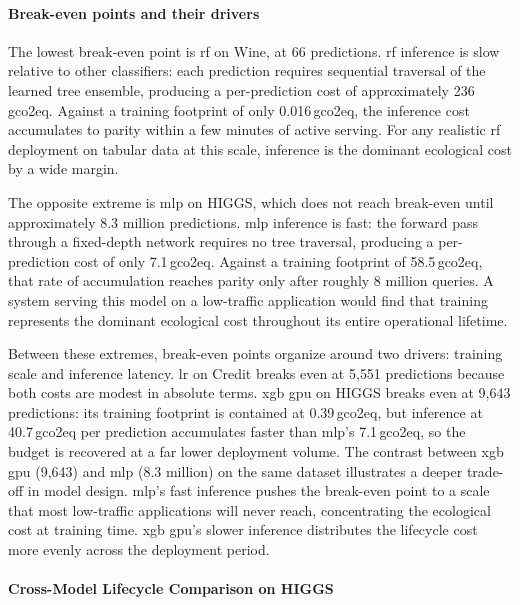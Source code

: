 \paragraph{Break-even points and their drivers}
The lowest break-even point is \gls{rf} on Wine, at 66 predictions. \gls{rf} inference is slow relative to other classifiers: each prediction requires sequential traversal of the learned tree ensemble, producing a per-prediction cost of approximately 236\,\textmu\gls{gco2eq}. Against a training footprint of only 0.016\,\gls{gco2eq}, the inference cost accumulates to parity within a few minutes of active serving. For any realistic \gls{rf} deployment on tabular data at this scale, inference is the dominant ecological cost by a wide margin.

The opposite extreme is \gls{mlp} on HIGGS, which does not reach break-even until approximately 8.3 million predictions. \gls{mlp} inference is fast: the forward pass through a fixed-depth network requires no tree traversal, producing a per-prediction cost of only 7.1\,\textmu\gls{gco2eq}. Against a training footprint of 58.5\,\gls{gco2eq}, that rate of accumulation reaches parity only after roughly 8 million queries. A system serving this model on a low-traffic application would find that training represents the dominant ecological cost throughout its entire operational lifetime.

Between these extremes, break-even points organize around two drivers: training scale and inference latency. \gls{lr} on Credit breaks even at 5{,}551 predictions because both costs are modest in absolute terms. \gls{xgb} \gls{gpu} on HIGGS breaks even at 9{,}643 predictions: its training footprint is contained at 0.39\,\gls{gco2eq}, but inference at 40.7\,\textmu\gls{gco2eq} per prediction accumulates faster than \gls{mlp}'s 7.1\,\textmu\gls{gco2eq}, so the budget is recovered at a far lower deployment volume. The contrast between \gls{xgb} \gls{gpu} (9{,}643) and \gls{mlp} (8.3 million) on the same dataset illustrates a deeper trade-off in model design. \gls{mlp}'s fast inference pushes the break-even point to a scale that most low-traffic applications will never reach, concentrating the ecological cost at training time. \gls{xgb} \gls{gpu}'s slower inference distributes the lifecycle cost more evenly across the deployment period.
\FloatBarrier
\paragraph{Cross-Model Lifecycle Comparison on HIGGS}


